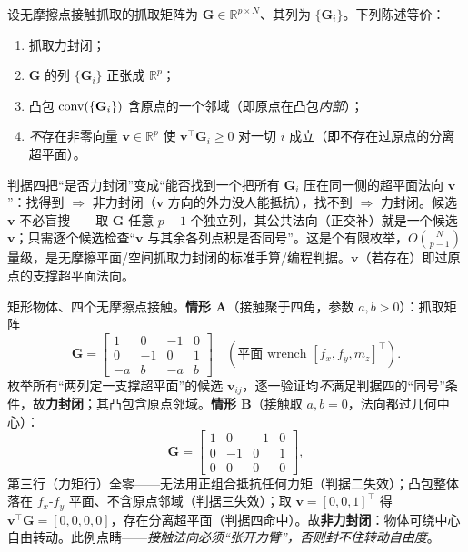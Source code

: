 \begin{theorem}[无摩擦点接触力封闭的凸性等价判据]
\label{thm:gc-fc-convex}
设无摩擦点接触抓取的抓取矩阵为 $\mathbf{G}\in\mathbb{R}^{p\times N}$、其列为 $\{\mathbf{G}_i\}$。下列陈述等价\cite{murray1994mathematical}：
\begin{enumerate}
  \item 抓取力封闭；
  \item $\mathbf{G}$ 的列 $\{\mathbf{G}_i\}$ 正张成 $\mathbb{R}^p$；
  \item 凸包 $\operatorname{conv}(\{\mathbf{G}_i\})$ 含原点的一个邻域（即原点在凸包\emph{内部}）；
  \item \emph{不}存在非零向量 $\mathbf{v}\in\mathbb{R}^p$ 使 $\mathbf{v}^\top\mathbf{G}_i\ge0$ 对一切 $i$ 成立（即不存在过原点的分离超平面）。
\end{enumerate}
\end{theorem}

\begin{note}[判据四为何最便于计算]
判据四把“是否力封闭”变成“能否找到一个把所有 $\mathbf{G}_i$ 压在同一侧的超平面法向 $\mathbf{v}$”：找得到 $\Rightarrow$ 非力封闭（$\mathbf{v}$ 方向的外力没人能抵抗），找不到 $\Rightarrow$ 力封闭。候选 $\mathbf{v}$ 不必盲搜——取 $\mathbf{G}$ 任意 $p-1$ 个独立列，其公共法向（正交补）就是一个候选 $\mathbf{v}$；只需逐个候选检查“$\mathbf{v}$ 与其余各列点积是否同号”。这是个有限枚举，$O\binom{N}{p-1}$ 量级，是无摩擦平面/空间抓取力封闭的标准手算/编程判据。$\mathbf{v}$（若存在）即过原点的支撑超平面法向。
\end{note}

\begin{example}
\label{ex:gc-planar-fc}
矩形物体、四个无摩擦点接触\cite{murray1994mathematical}。\textbf{情形 A}（接触聚于四角，参数 $a,b>0$）：抓取矩阵
\[
  \mathbf{G}=\begin{bmatrix}1&0&-1&0\\ 0&-1&0&1\\ -a&b&-a&b\end{bmatrix}
  \quad(\text{平面 wrench }[f_x,f_y,m_z]^\top).
\]
枚举所有“两列定一支撑超平面”的候选 $\mathbf{v}_{ij}$，逐一验证均\emph{不}满足判据四的“同号”条件，故\textbf{力封闭}；其凸包含原点邻域。\textbf{情形 B}（接触取 $a,b=0$，法向都过几何中心）：
\[
  \mathbf{G}=\begin{bmatrix}1&0&-1&0\\ 0&-1&0&1\\ 0&0&0&0\end{bmatrix},
\]
第三行（力矩行）全零——无法用正组合抵抗任何力矩（判据二失效）；凸包整体落在 $f_x\text{-}f_y$ 平面、不含原点邻域（判据三失效）；取 $\mathbf{v}=[0,0,1]^\top$ 得 $\mathbf{v}^\top\mathbf{G}=[0,0,0,0]$，存在分离超平面（判据四命中）。故\textbf{非力封闭}：物体可绕中心自由转动。此例点睛——\emph{接触法向必须“张开力臂”，否则封不住转动自由度}。
\end{example}

